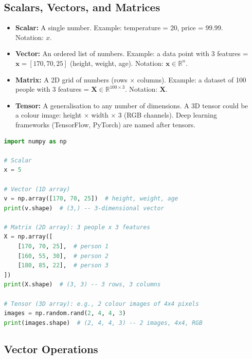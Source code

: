 \documentclass[12pt, a4paper, oneside]{book}
\begin{document}
\subsection{Scalars, Vectors, and Matrices}

\begin{itemize}[leftmargin=2em]
    \item \textbf{Scalar:} A single number. Example: temperature = 20, price = 99.99. Notation: $x$.
    \item \textbf{Vector:} An ordered list of numbers. Example: a data point with 3 features = $\mathbf{x} = [170, 70, 25]$ (height, weight, age). Notation: $\mathbf{x} \in \mathbb{R}^n$.
    \item \textbf{Matrix:} A 2D grid of numbers (rows $\times$ columns). Example: a dataset of 100 people with 3 features = $\mathbf{X} \in \mathbb{R}^{100 \times 3}$. Notation: $\mathbf{X}$.
    \item \textbf{Tensor:} A generalisation to any number of dimensions. A 3D tensor could be a colour image: height $\times$ width $\times$ 3 (RGB channels). Deep learning frameworks (TensorFlow, PyTorch) are named after tensors.
\end{itemize}

\begin{lstlisting}[language=Python, caption={Vectors and matrices in NumPy}]
import numpy as np

# Scalar
x = 5

# Vector (1D array)
v = np.array([170, 70, 25])  # height, weight, age
print(v.shape)  # (3,) -- 3-dimensional vector

# Matrix (2D array): 3 people x 3 features
X = np.array([
    [170, 70, 25],  # person 1
    [160, 55, 30],  # person 2
    [180, 85, 22],  # person 3
])
print(X.shape)  # (3, 3) -- 3 rows, 3 columns

# Tensor (3D array): e.g., 2 colour images of 4x4 pixels
images = np.random.rand(2, 4, 4, 3)
print(images.shape)  # (2, 4, 4, 3) -- 2 images, 4x4, RGB
\end{lstlisting}

\subsection{Vector Operations}
\end{document}
